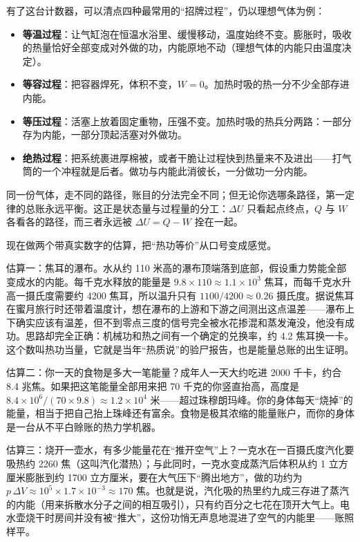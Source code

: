 \begin{mainline}
有了这台计数器，可以清点四种最常用的“招牌过程”，仍以理想气体为例：

\begin{itemize}
  \item \textbf{等温过程}：让气缸泡在恒温水浴里、缓慢移动，温度始终不变。膨胀时，吸收的热量恰好全部变成对外做的功，内能原地不动（理想气体的内能只由温度决定）。
  \item \textbf{等容过程}：把容器焊死，体积不变，\(W=0\)。加热时吸的热一分不少全部存进内能。
  \item \textbf{等压过程}：活塞上放着固定重物，压强不变。加热时吸的热兵分两路：一部分存为内能，一部分顶起活塞对外做功。
  \item \textbf{绝热过程}：把系统裹进厚棉被，或者干脆让过程快到热量来不及进出——打气筒的一个冲程就是后者。做功与内能此消彼长，一分做功一分内能。
\end{itemize}

同一份气体，走不同的路径，账目的分法完全不同；但无论你选哪条路径，第一定律的总账永远平衡。这正是状态量与过程量的分工：\(\Delta U\) 只看起点终点，\(Q\) 与 \(W\) 各看各的路径，而三者永远被 \(\Delta U=Q-W\) 拴在一起。

现在做两个带真实数字的估算，把“热功等价”从口号变成感觉。

估算一：焦耳的瀑布。水从约 110 米高的瀑布顶端落到底部，假设重力势能全部变成水的内能。每千克水释放的能量是 \(9.8\times110\approx1.1\times10^{3}\) 焦耳，而每千克水升高一摄氏度需要约 4200 焦耳，所以温升只有 \(1100/4200\approx0.26\) 摄氏度。据说焦耳在蜜月旅行时还带着温度计，想在瀑布的上游和下游之间测出这点温差——瀑布上下确实应该有温差，但不到零点三度的信号完全被水花掺混和蒸发淹没，他没有成功。思路却完全正确：机械功和热之间有一个确定的兑换率，约 4.2 焦耳换一卡。这个数叫热功当量，它就是当年“热质说”的验尸报告，也是能量总账的出生证明。

估算二：你一天的食物是多大一笔能量？成年人一天大约吃进 2000 千卡，约合 8.4 兆焦。如果把这笔能量全部用来把 70 千克的你竖直抬高，高度是 \(8.4\times10^{6}/(70\times9.8)\approx1.2\times10^{4}\) 米——超过珠穆朗玛峰。你的身体每天“烧掉”的能量，相当于把自己抬上珠峰还有富余。食物是极其浓缩的能量账户，而你的身体是一台从不平白赊账的热力学机器。

估算三：烧开一壶水，有多少能量花在“推开空气”上？一克水在一百摄氏度汽化要吸热约 2260 焦（这叫汽化潜热）；与此同时，一克水变成蒸汽后体积从约 1 立方厘米膨胀到约 1700 立方厘米，要在大气压下“腾出地方”，做的功约为 \(p\,\Delta V\approx10^{5}\times1.7\times10^{-3}\approx170\) 焦。也就是说，汽化吸的热里约九成三存进了蒸汽的内能（用来拆散水分子之间的相互吸引），只有约百分之七花在顶开大气上。电水壶烧干时房间并没有被“推大”，这份功悄无声息地混进了空气的内能里——账照样平。
\end{mainline}

